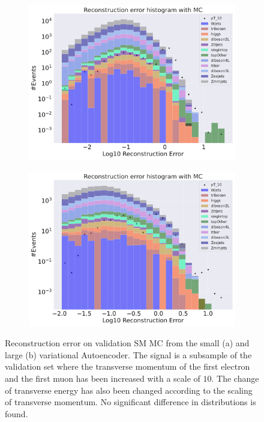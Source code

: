 \begin{figure}[H]
    \centering
    \begin{subfigure}{.45\textwidth}
        \includegraphics[width=\textwidth]{Figures/VAE_testing/small/b_data_recon_big_rm3_feats_sig_pT_10.pdf}
        \caption{ }
        \label{fig:VAE_small_pt_10}
    \end{subfigure}
    \hfill 
    \begin{subfigure}{.45\textwidth}
        \includegraphics[width=\textwidth]{Figures/VAE_testing/big/b_data_recon_big_rm3_feats_sig_pT_10.pdf}
        \caption{}
        \label{fig:VAE_big_pt_10}
    \end{subfigure}
    \hfill 
    \caption[VAE | Reconstruction error $p_T$ altering of 10]{Reconstruction error on validation SM MC from the small (a) and large (b) variational Autoencoder. The signal is a subsample of the validation 
    set where the transverse momentum of the first electron and the first muon has been increased with a scale of $10$. The change of transverse 
    energy has also been changed according to the scaling of transverse momentum. No significant difference in distributions is found. }
    \label{fig:VAE_big_small_pt_10}
\end{figure}
